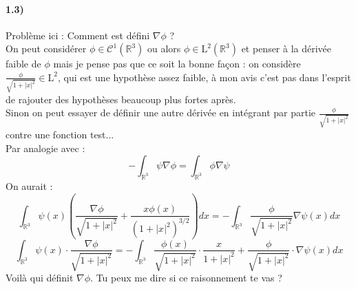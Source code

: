 \documentclass[12pt,a4paper,titlepage]{article}
\newcommand{\R}{\mathbb{R}}
\begin{document}
\paragraph{1.3)}
Problème ici : Comment est défini $\nabla \phi$ ? \\
On peut considérer $\phi \in \mathcal{C}^1(\R^3)$ ou alors $\phi \in \text{L}^2(\R^3)$ et penser à la dérivée faible de $\phi$ mais je pense pas que ce soit la bonne façon : on considère $\frac{\phi}{\sqrt{1+|x|^2}} \in \text{L}^2$, qui est une hypothèse assez faible, à mon avis c'est pas dans l'esprit de rajouter des hypothèses beaucoup plus fortes après.\\
Sinon on peut essayer de définir une autre dérivée en intégrant par partie $\frac{\phi}{\sqrt{1+|x|^2}}$ contre une fonction test...\\
Par analogie avec :
$$- \int_{\R^3} \psi \nabla \phi = \int_{\R^3} \phi \nabla \psi$$
On aurait :
$$ \int_{\R^3} \psi(x) \left( \frac{\nabla \phi}{\sqrt{1+|x|^2}} + \frac{x \phi(x)}{(1+|x|^2)^{3/2}} \right) dx = - \int_{\R^3} \frac{\phi}{\sqrt{1+|x|^2}} \nabla \psi(x) dx $$
$$ \int_{\R^3} \psi(x) \cdot \frac{\nabla \phi}{\sqrt{1+|x|^2}} = - \int_{\R^3} \frac{\phi(x)}{\sqrt{1+|x|^2}} \cdot \frac{x}{1+|x|^2} + \frac{\phi}{\sqrt{1+|x|^2}} \cdot \nabla \psi(x) dx $$
Voilà qui définit $\nabla\phi$. Tu peux me dire si ce raisonnement te vas ?
\end{document}
